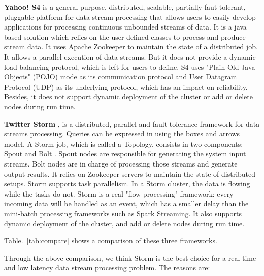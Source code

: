 \documentclass[	DIV=calc,%
							paper=a4,%
							fontsize=11pt,%
							twocolumn]{scrartcl}	 					%
\begin{document}
\textbf{Yahoo! S4}  is a general-purpose, distributed, scalable, partially faut-tolerant, pluggable platform for data stream processing that allows users to easily develop applications for processing continuous unbounded streams of data. It is a java based solution which relies on the user defined classes to process and produce stream data. It uses Apache Zookeeper \cite{Zookeeper} to maintain the state of a distributed job. It allows a parallel execution of data streams. But it does not provide a dynamic load balancing protocol, which is left for users to define. S4 uses "Plain Old Java Objects" (POJO) mode as its communication protocol and User Datagram Protocol (UDP) as its underlying protocol, which has an impact on reliability. Besides, it does not support dynamic deployment of the cluster or add or delete nodes during run time.

 \textbf{Twitter Storm} \cite{Toshniwal:2014:STO:2588555.2595641}, is a distributed, parallel and fault tolerance framework for data streams processing. Queries can be expressed in using the boxes and arrows model. A Storm job, which is called a Topology, consists in two components: Spout and Bolt . Spout nodes are responsible for generating the system input streams. Bolt nodes are in charge of processing those streams and generate output results. It relies on Zookeeper servers to maintain the state of distributed setups. Storm supports task parallelism. In a Storm cluster, the data is flowing while the tasks do not. Storm is a real "flow processing" framework: every incoming data will be handled as an event, which has a smaller delay than the mini-batch processing frameworks such as Spark Streaming. It also supports dynamic deployment of the cluster, and add or delete nodes during run time.
 
 Table.~\ref{tab:compare} shows a comparison of these three frameworks.

Through the above comparison, we think Storm is the best choice for a real-time and low latency data stream processing problem. The reasons are:
\end{document}
